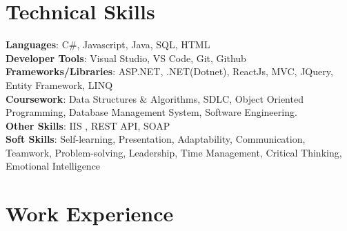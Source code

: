 \documentclass[a4paper,12pt]{article}
\begin{document}
\section{\textbf{Technical Skills}}
 \begin{itemize}[leftmargin=0.1in, label={}]
    \small{\item{
     \textbf{Languages}{: C\#, Javascript, Java, SQL, HTML} \\
     \textbf{Developer Tools}{: Visual Studio, VS Code, Git, Github } \\
     \textbf{Frameworks/Libraries}{: ASP.NET, .NET(Dotnet), ReactJs, MVC, JQuery, Entity Framework, LINQ } \\
     \textbf{Coursework}{: Data Structures \& Algorithms, SDLC, Object Oriented Programming, Database Management System, Software Engineering.} \\
     \textbf{Other Skills}{:  IIS , REST API, SOAP} \\
     \textbf{Soft Skills}{: Self-learning, Presentation, Adaptability, Communication, Teamwork, Problem-solving, Leadership, Time Management, Critical Thinking, Emotional Intelligence} \\
    }}
 \end{itemize}

\section{Work Experience}
\end{document}
